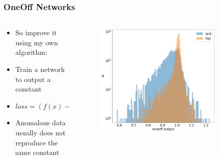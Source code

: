 \documentclass[hyperref={pdfpagelabels=false}]{beamer}
\begin{document}
\begin{frame}[label=oo_0]
\frametitle{OneOff Networks}
\begin{columns}[c] %
\begin{column}{0.3\textwidth}%
\begin{itemize}

    \item So improve it using my own algorithm:

    \item Train a network to output a constant

    \item $loss = \left(f{\left(x \right)} - 1\right)^{2}$

    \item Anomalous data usually does not reproduce the same constant


\end{itemize}
\end{column}%
\hfill%
\begin{column}{0.68\textwidth}%
\begin{figure}[H] 
  \centering
\includegraphics[width=0.85\textwidth]{../imgs/toosephist}
\label{fig:toosephist}
  \end{figure}


\end{column}%
\hfill%
\end{columns}

\end{frame}



\newpage
\end{document}
